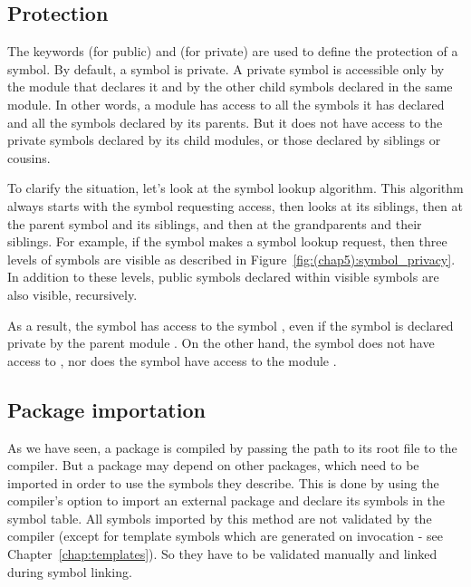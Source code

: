 \subsection{Protection}
\label{sec:symbol_protection}

The keywords  (for public) and  (for private) are used
to define the protection of a symbol. By default, a symbol is private. A private
symbol is accessible only by the module that declares it and by the other child
symbols declared in the same module. In other words, a module has access to all
the symbols it has declared and all the symbols declared by its parents. But it
does not have access to the private symbols declared by its child modules, or
those declared by siblings or cousins.

To clarify the situation, let's look at the symbol lookup algorithm. This
algorithm always starts with the symbol requesting access, then looks at its
siblings, then at the parent symbol and its siblings, and then at the
grandparents and their siblings. For example, if the symbol
 makes a symbol lookup request, then three levels
of symbols are visible as described in Figure~\ref{fig:(chap5):symbol_privacy}. In
addition to these levels, public symbols declared within visible symbols are
also visible, recursively.



As a result, the symbol  has access to the symbol
, even if the symbol  is declared
private by the parent module . On the other hand, the symbol
 does not have access to
, nor does the symbol  have access to
the module .

\subsection{Package importation}

As we have seen, a package is compiled by passing the path to its root file to
the compiler. But a package may depend on other packages, which need to be
imported in order to use the symbols they describe. This is done by using the
compiler's  option to import an external package and declare its
symbols in the symbol table. All symbols imported by this method are not
validated by the compiler (except for template symbols which are generated on
invocation - see Chapter~\ref{chap:templates}). So they have to be validated
manually and linked during symbol linking.

